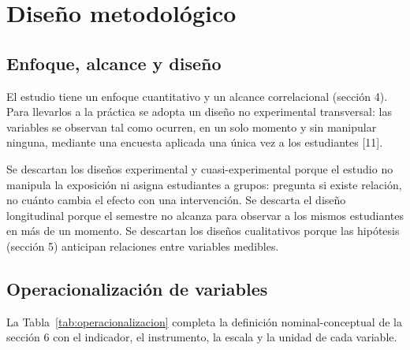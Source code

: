 
\section{Diseño metodológico}

\subsection{Enfoque, alcance y diseño}

El estudio tiene un enfoque cuantitativo y un alcance correlacional (sección 4). Para
llevarlos a la práctica se adopta un diseño no experimental transversal: las variables se
observan tal como ocurren, en un solo momento y sin manipular ninguna, mediante una
encuesta aplicada una única vez a los estudiantes [11].

Se descartan los diseños experimental y cuasi-experimental porque el estudio no
manipula la exposición ni asigna estudiantes a grupos: pregunta si existe relación, no
cuánto cambia el efecto con una intervención. Se descarta el diseño longitudinal porque el
semestre no alcanza para observar a los mismos estudiantes en más de un momento. Se
descartan los diseños cualitativos porque las hipótesis (sección 5) anticipan relaciones
entre variables medibles.

\subsection{Operacionalización de variables}

La Tabla~\ref{tab:operacionalizacion} completa la definición nominal-conceptual de la
sección 6 con el indicador, el instrumento, la escala y la unidad de cada variable.

